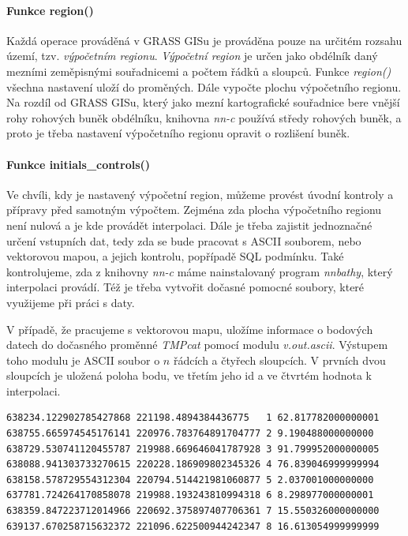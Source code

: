 \documentclass[12pt,a4paper]{article}
\begin{document}
\bigskip
\paragraph{Funkce region()}

Každá operace prováděná v GRASS GISu je prováděna pouze na určitém
rozsahu území, tzv. \emph{výpočetním regionu}. \emph{Výpočetní region}
je určen jako obdélník daný mezními zeměpisnými souřadnicemi a
počtem řádků a sloupců.  Funkce \emph{region()} všechna nastavení
uloží do proměných. Dále vypočte plochu výpočetního regionu. Na rozdíl
od GRASS GISu, který jako mezní kartografické souřadnice bere vnější
rohy rohových buněk obdélníku, knihovna \emph{nn-c} používá středy
rohových buněk, a proto je třeba nastavení výpočetního regionu opravit
o rozlišení buněk.

\bigskip
\paragraph{Funkce initials\_controls()}

Ve chvíli, kdy je nastavený výpočetní region, můžeme provést úvodní
kontroly a přípravy před samotným výpočtem. Zejména zda plocha
výpočetního regionu není nulová a je kde provádět interpolaci. Dále je
třeba zajistit jednoznačné určení vstupních dat, tedy zda se bude
pracovat s ASCII souborem, nebo vektorovou mapou, a jejich kontrolu,
popřípadě SQL podmínku. Také kontrolujeme, zda z knihovny \emph{nn-c}
máme nainstalovaný program \emph{nnbathy}, který interpolaci
provádí. Též je třeba vytvořit dočasné pomocné soubory, které
využijeme při práci s daty.

V případě, že pracujeme s vektorovou mapu, uložíme informace o
bodových datech do dočasného proměnné \emph{TMPcat} pomocí modulu
\emph{v.out.ascii}. Výstupem toho modulu je ASCII soubor o $n$ řádcích
a čtyřech sloupcích. V prvních dvou sloupcích je uložená poloha bodu,
ve třetím jeho id a ve čtvrtém hodnota k interpolaci.

\bigskip
\lstset{basicstyle=\footnotesize}
\begin{lstlisting}[caption={Pomocný soubor TMPcat}]
638234.122902785427868 221198.4894384436775   1 62.817782000000001
638755.665974545176141 220976.783764891704777 2 9.190488000000000
638729.530741120455787 219988.669646041787928 3 91.799952000000005
638088.941303733270615 220228.186909802345326 4 76.839046999999994
638158.578729554312304 220794.514421981060877 5 2.037001000000000
637781.724264170858078 219988.193243810994318 6 8.298977000000001
638359.847223712014966 220692.375897407706361 7 15.550326000000000
639137.670258715632372 221096.622500944242347 8 16.613054999999999
\end{lstlisting}
\end{document}
